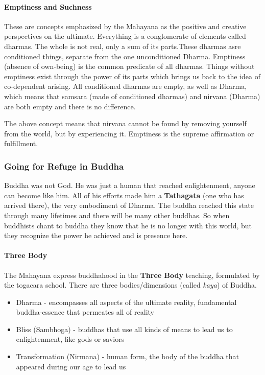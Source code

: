 \documentclass{article}
\begin{document}
\paragraph{Emptiness and Suchness}
\label{par:emptiness_and_suchness}
These are concepts emphasized by the Mahayana as the positive and creative perspectives on the ultimate. Everything is a conglomerate of elements called dharmas. The whole is not real, only a sum of its parts.These dharmas asre conditioned things, separate from the one unconditioned Dharma. Emptiness (absence of own-being) is the common predicate of all dharmas. Things without emptiness exist through the power of its parts which brings us back to the idea of co-dependent arising. All conditioned dharmas are empty, as well as Dharma, which means that samsara (made of conditioned dharmas) and nirvana (Dharma) are both empty and there is no difference.

The above concept means that nirvana cannot be found by removing yourself from the world, but by experiencing it. Emptiness is the supreme affirmation or fulfillment.

\subsubsection{Going for Refuge in Buddha}
\label{ssub:going_for_refuge_in_buddha}
Buddha was not God. He was just a human that reached enlightenment, anyone can become like him. All of his efforts made him a \textbf{Tathagata} (one who has arrived there), the very embodiment of Dharma. The buddha reached this state through many lifetimes and there will be many other buddhas. So when buddhists chant to buddha they know that he is no longer with this world, but they recognize the power he achieved and is presence here.

\paragraph{Three Body}
\label{par:three_body}
The Mahayana express buddhahood in the \textbf{Three Body} teaching, formulated by the togacara school. There are three bodies/dimensions (called \emph{kaya}) of Buddha.
\begin{itemize}
	\item Dharma - encompasses all aspects of the ultimate reality, fundamental buddha-essence that permeates all of reality
	\item Bliss (Sambhoga) - buddhas that use all kinds of means to lead us to enlightenment, like gods or saviors
	\item Transformation (Nirmana) - human form, the body of the buddha that appeared during our age to lead us
\end{itemize}
\end{document}
